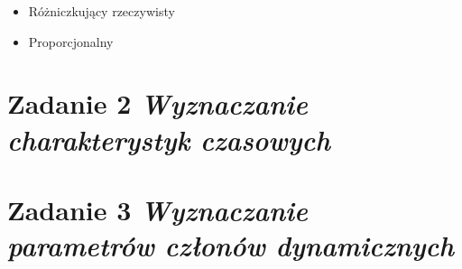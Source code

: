 \documentclass[a4paper,10pt]{article}
\begin{document}
\begin{itemize}
\item Różniczkujący rzeczywisty

\item Proporcjonalny

\end{itemize}

\section{Zadanie 2 \textit{\small Wyznaczanie charakterystyk czasowych}}\label{sec:zad2}

\section{Zadanie 3 \textit{\small Wyznaczanie parametrów członów dynamicznych}}\label{sec:zad3}
\end{document}
